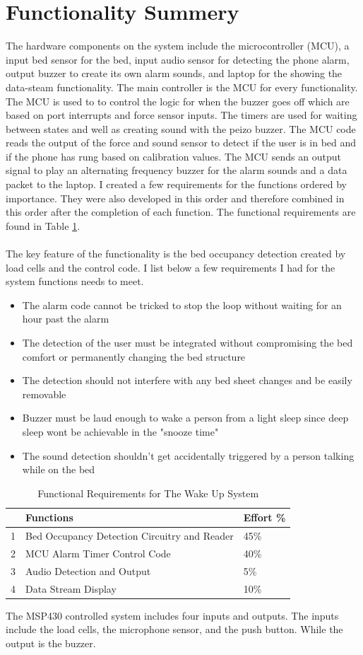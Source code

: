 \documentclass[11pt]{article}
\begin{document}
\section{Functionality Summery}
The hardware components on the system include the microcontroller (MCU), a input bed sensor for the bed, input audio sensor for detecting the phone alarm, output buzzer to create its own alarm sounds, and laptop for the showing the data-steam functionality. 
The main controller is the MCU for every functionality.
The MCU is used to to control the logic for when the buzzer goes off which are based on port interrupts and force sensor inputs. 
The timers are used for waiting between states and well as creating sound with the peizo buzzer.
The MCU code reads the output of the force and sound sensor to detect if the user is in bed and if the phone has rung based on calibration values.
The MCU sends an output signal to play an alternating frequency buzzer for the alarm sounds and a data packet to the laptop. 
I created a few requirements for the functions ordered by importance.
They were also developed in this order and therefore combined in this order after the completion of each function.
The functional requirements are found in Table \ref{tab:FR}.\\
\\
The key feature of the functionality is the bed occupancy detection created by load cells and the control code.
I list below a few requirements I had for the system functions needs to meet.
\begin{itemize}
	\item The alarm code cannot be tricked to stop the loop without waiting for an hour past the alarm
	\item The detection of the user must be integrated without compromising the bed comfort or permanently changing the bed structure 
	\item The detection should not interfere with any bed sheet changes and be easily removable
	\item Buzzer must be laud enough to wake a person from a light sleep since deep sleep wont be achievable in the "snooze time"
	\item The sound detection shouldn't get accidentally triggered by a person talking while on the bed
\end{itemize} 

\begin{table}[H]
	\centering
	\caption{Functional Requirements for The Wake Up System}
	\begin{tabular}{|l|l|l|}
		\hline
		&\textbf{Functions} &Effort \%\\
		\hline
		1&Bed Occupancy Detection Circuitry and Reader& 45\%\\
		2&MCU Alarm Timer Control Code& 40\%\\
		3&Audio Detection and Output &5\%\\
		4&Data Stream Display &10\%\\
		\hline
	\end{tabular}
	\label{tab:FR}
\end{table}
The MSP430 controlled system includes four inputs and outputs.
The inputs include the load cells, the microphone sensor, and the push button.
While the output is the buzzer. 
\end{document}
